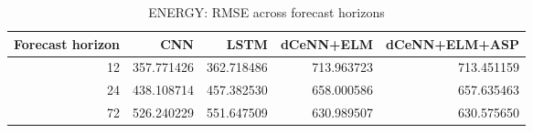 \begin{table}
\caption{ENERGY: RMSE across forecast horizons}
\begin{tabular}{rrrrr}
\toprule
Forecast horizon & CNN & LSTM & dCeNN+ELM & dCeNN+ELM+ASP \\
\midrule
12 & 357.771426 & 362.718486 & 713.963723 & 713.451159 \\
24 & 438.108714 & 457.382530 & 658.000586 & 657.635463 \\
72 & 526.240229 & 551.647509 & 630.989507 & 630.575650 \\
\bottomrule
\end{tabular}
\end{table}
